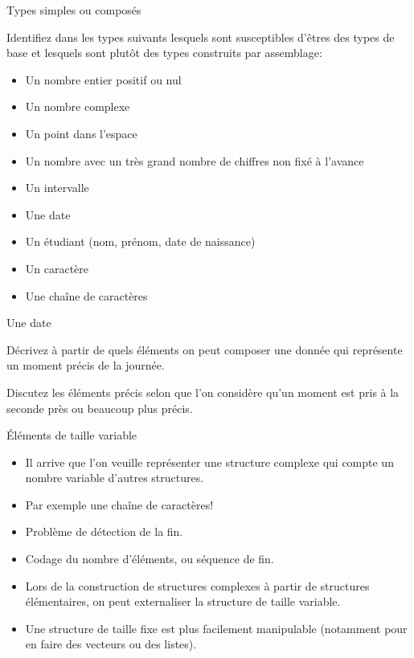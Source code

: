 \begin{exercice}
  \begin{exercicelet}{Types simples ou composés}
    \begin{questions}
    \item Identifiez dans les types suivants lesquels sont susceptibles
      d'êtres des types de base et lesquels sont plutôt des types construits
      par assemblage:
      \begin{itemize}
      \item Un nombre entier positif ou nul
      \item Un nombre complexe
      \item Un point dans l'espace
      \item Un nombre avec un très grand nombre de chiffres non fixé à
        l'avance
      \item Un intervalle
      \item Une date
      \item Un étudiant (nom, prénom, date de naissance)
      \item Un caractère
      \item Une chaîne de caractères
      \end{itemize}
    \end{questions}
  \end{exercicelet}
  \begin{exercicelet}{Une date}
    \begin{questions}
    \item Décrivez à partir de quels éléments on peut composer une donnée qui
      représente un moment précis de la journée.
    \item Discutez les éléments précis selon que l'on considère qu'un moment
      est pris à la seconde près ou beaucoup plus précis.
    \end{questions}
  \end{exercicelet}
\end{exercice}
\begin{frame}{Éléments de taille variable}
  \begin{itemize}
  \item[\ddialogquestion] Il arrive que l'on veuille représenter une structure
    complexe qui compte un nombre variable d'autres structures.
  \item[\dialoginformation] Par exemple une chaîne de caractères!
  \item Problème de détection de la fin.
  \item Codage du nombre d'éléments, ou séquence de fin.
  \item[\ddialogwarning] Lors de la construction de structures complexes à
    partir de structures élémentaires, on peut externaliser la structure de
    taille variable.
  \item[\ddialoginformation] Une structure de taille fixe est plus facilement
    manipulable (notamment pour en faire des vecteurs ou des listes).
  \end{itemize}
\end{frame}
